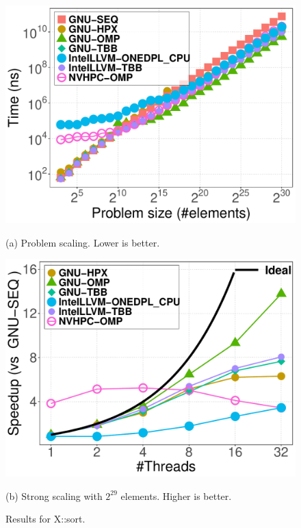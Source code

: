 \documentclass[sigconf]{acmart}
\begin{document}
\begin{figure}[H]
      \centering
      \begin{minipage}[t]{0.48\linewidth}
            \centering
            \includegraphics[width=\linewidth]{figures/problemSize_time-sort}
            \caption*{(a) Problem scaling. Lower is better.}
      \end{minipage}
      \hfill
      \begin{minipage}[t]{0.48\linewidth}
            \centering
            \includegraphics[width=\linewidth]{figures/speedup_threads-sort}
            \caption*{(b) Strong scaling with $2^{29}$ elements. Higher is better.}
      \end{minipage}
      \caption{Results for X::sort.}\label{fig:x::sort}
\end{figure}
\end{document}

